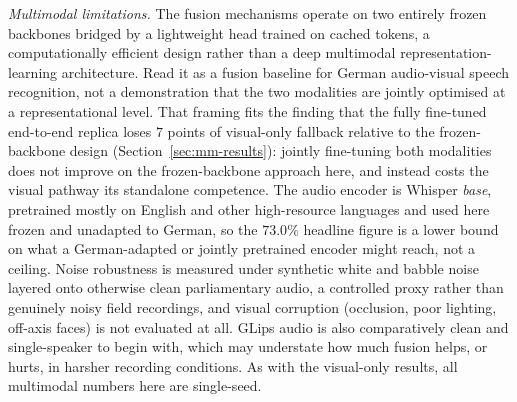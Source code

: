 \documentclass[10pt, a4paper]{article}
\begin{document}
\noindent\emph{Multimodal limitations.} The fusion mechanisms operate on two entirely frozen backbones bridged by a lightweight head trained on cached tokens, a computationally efficient design rather than a deep multimodal representation-learning architecture. Read it as a fusion baseline for German audio-visual speech recognition, not a demonstration that the two modalities are jointly optimised at a representational level. That framing fits the finding that the fully fine-tuned end-to-end replica loses $7$ points of visual-only fallback relative to the frozen-backbone design (Section~\ref{sec:mm-results}): jointly fine-tuning both modalities does not improve on the frozen-backbone approach here, and instead costs the visual pathway its standalone competence. The audio encoder is Whisper \emph{base}, pretrained mostly on English and other high-resource languages and used here frozen and unadapted to German, so the $73.0\%$ headline figure is a lower bound on what a German-adapted or jointly pretrained encoder might reach, not a ceiling. Noise robustness is measured under synthetic white and babble noise layered onto otherwise clean parliamentary audio, a controlled proxy rather than genuinely noisy field recordings, and visual corruption (occlusion, poor lighting, off-axis faces) is not evaluated at all. GLips audio is also comparatively clean and single-speaker to begin with, which may understate how much fusion helps, or hurts, in harsher recording conditions. As with the visual-only results, all multimodal numbers here are single-seed.
\end{document}
